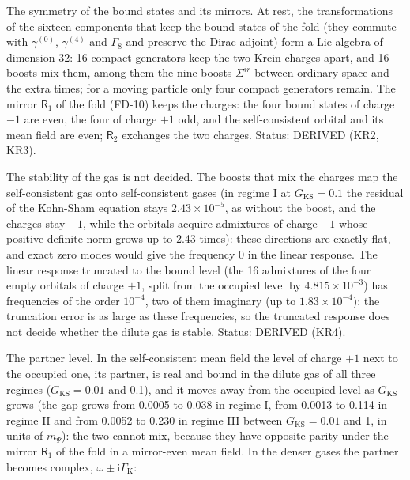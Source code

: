 \documentclass[
  10pt,
]{article}
\begin{document}
The symmetry of the bound states and its mirrors. At rest, the
transformations of the sixteen components that keep the bound states of
the fold (they commute with \(\gamma^{(0)}\), \(\gamma^{(4)}\) and
\(\Gamma_8\) and preserve the Dirac adjoint) form a Lie algebra of
dimension 32: 16 compact generators keep the two Krein charges apart,
and 16 boosts mix them, among them the nine boosts \(\Sigma^{ir}\)
between ordinary space and the extra times; for a moving particle only
four compact generators remain. The mirror \(\mathsf{R}_1\) of the fold
(FD-10) keeps the charges: the four bound states of charge \(-1\) are
even, the four of charge \(+1\) odd, and the self-consistent orbital and
its mean field are even; \(\mathsf{R}_2\) exchanges the two charges.
Status: DERIVED (KR2, KR3).

The stability of the gas is not decided. The boosts that mix the charges
map the self-consistent gas onto self-consistent gases (in regime I at
\(G_{\mathrm{KS}} = 0.1\) the residual of the Kohn-Sham equation stays
\(2.43\times10^{-5}\), as without the boost, and the charges stay
\(-1\), while the orbitals acquire admixtures of charge \(+1\) whose
positive-definite norm grows up to 2.43 times): these directions are
exactly flat, and exact zero modes would give the frequency 0 in the
linear response. The linear response truncated to the bound level (the
16 admixtures of the four empty orbitals of charge \(+1\), split from
the occupied level by \(4.815\times10^{-3}\)) has frequencies of the
order \(10^{-4}\), two of them imaginary (up to \(1.83\times10^{-4}\)):
the truncation error is as large as these frequencies, so the truncated
response does not decide whether the dilute gas is stable. Status:
DERIVED (KR4).

The partner level. In the self-consistent mean field the level of charge
\(+1\) next to the occupied one, its partner, is real and bound in the
dilute gas of all three regimes (\(G_{\mathrm{KS}} = 0.01\) and 0.1),
and it moves away from the occupied level as \(G_{\mathrm{KS}}\) grows
(the gap grows from 0.0005 to 0.038 in regime I, from 0.0013 to 0.114 in
regime II and from 0.0052 to 0.230 in regime III between
\(G_{\mathrm{KS}} = 0.01\) and 1, in units of \(m_\Psi\)): the two
cannot mix, because they have opposite parity under the mirror
\(\mathsf{R}_1\) of the fold in a mirror-even mean field. In the denser
gases the partner becomes complex,
\(\omega \pm \mathrm{i}\Gamma_{\mathrm{K}}\):
\end{document}
